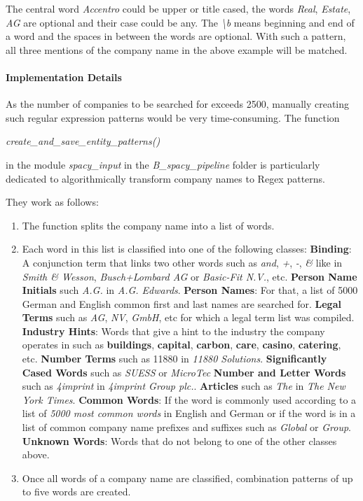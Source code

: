 The central word \emph{Accentro} could be upper or title cased, the words \emph{Real}, \emph{Estate}, \emph{AG} are optional and their case could be any.
The \emph{\textbackslash b} means beginning and end of a word and the spaces in between the words are optional.
With such a pattern, all three mentions of the company name in the above example will be matched.

\paragraph{Implementation Details}
As the number of companies to be searched for exceeds 2500, manually creating such regular expression patterns would be very time-consuming.
The function

\begin{center}    
\emph{create\_and\_save\_entity\_patterns()}
\end{center}

in the module \emph{spacy\_input} in the \emph{B\_spacy\_pipeline} folder is particularly dedicated to algorithmically transform company names to \gls{Regex} patterns.


They work as follows:
\begin{enumerate}
  \item The function splits the company name into a list of words.
  \item Each word in this list is classified into one of the following classes:
    \subitem \textbf{Binding}: A conjunction term that links two other words such as \emph{and}, \emph{+}, \emph{-}, \emph{\&} like in \emph{Smith \& Wesson}, \emph{Busch+Lombard AG} or \emph{Basic-Fit N.V.}, etc.
    \subitem \textbf{Person Name Initials} such \emph{A.G.} in \emph{A.G. Edwards}.
    \subitem \textbf{Person Names}: For that, a list of 5000 German and English common first and last names are searched for.
    \subitem \textbf{Legal Terms} such as \emph{AG}, \emph{NV}, \emph{GmbH}, etc for which a legal term list was compiled.
    \subitem \textbf{Industry Hints}: Words that give a hint to the industry the company operates in such as \textbf{buildings}, \textbf{capital}, \textbf{carbon}, \textbf{care}, \textbf{casino}, \textbf{catering}, etc.
    \subitem \textbf{Number Terms} such as 11880 in \emph{11880 Solutions}.
    \subitem \textbf{Significantly Cased Words} such as \emph{SUESS} or \emph{MicroTec}
    \subitem \textbf{Number and Letter Words} such as \emph{4imprint} in \emph{4imprint Group plc.}.
    \subitem \textbf{Articles} such as \emph{The} in \emph{The New York Times}.
    \subitem \textbf{Common Words}: If the word is commonly used according to a list of \emph{5000 most common words} in English and German or if the word is in a list of common company name prefixes and suffixes such as \emph{Global} or \emph{Group}.
    \subitem \textbf{Unknown Words}: Words that do not belong to one of the other classes above.

  \item Once all words of a company name are classified, combination patterns of up to five words are created.
\end{enumerate}

